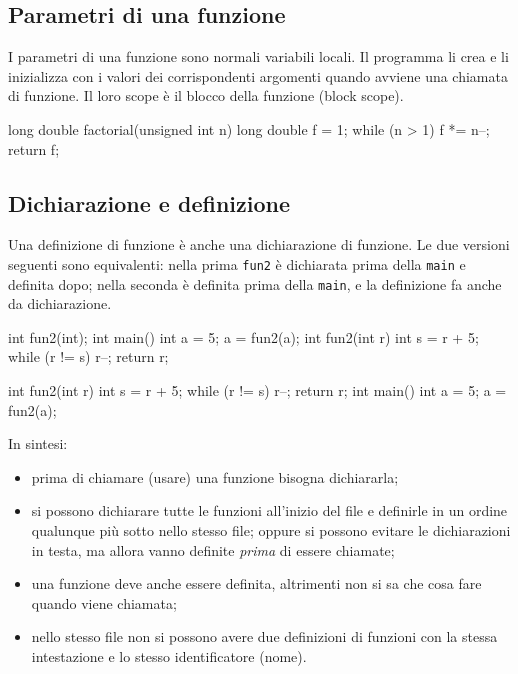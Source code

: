 \documentclass[11pt,a4paper]{article}
\begin{document}
\subsection{Parametri di una funzione}

I parametri di una funzione sono normali variabili locali. Il programma li crea e li inizializza con i valori dei corrispondenti argomenti quando avviene una chiamata di funzione. Il loro scope è il blocco della funzione (block scope).
\begin{codice}
long double factorial(unsigned int n)
{
    long double f = 1;
    while (n > 1)
        f *= n--;
    return f;
}
\end{codice}

\subsection{Dichiarazione e definizione}

Una definizione di funzione è anche una dichiarazione di funzione. Le due versioni seguenti sono equivalenti: nella prima \lstinline|fun2| è dichiarata prima della \lstinline|main| e definita dopo; nella seconda è definita prima della \lstinline|main|, e la definizione fa anche da dichiarazione.
\begin{codice}
int fun2(int);
int main() {
    int a = 5;
    a = fun2(a);
}
int fun2(int r) {
    int s = r + 5;
    while (r != s)
        r--;
    return r;
}
\end{codice}
\begin{codice}
int fun2(int r) {
    int s = r + 5;
    while (r != s)
        r--;
    return r;
}
int main() {
    int a = 5;
    a = fun2(a);
}
\end{codice}

In sintesi:
\begin{itemize}
    \item prima di chiamare (usare) una funzione bisogna dichiararla;
    \item si possono dichiarare tutte le funzioni all'inizio del file e definirle in un ordine qualunque più sotto nello stesso file; oppure si possono evitare le dichiarazioni in testa, ma allora vanno definite \emph{prima} di essere chiamate;
    \item una funzione deve anche essere definita, altrimenti non si sa che cosa fare quando viene chiamata;
    \item nello stesso file non si possono avere due definizioni di funzioni con la stessa intestazione e lo stesso identificatore (nome).
\end{itemize}
\end{document}
